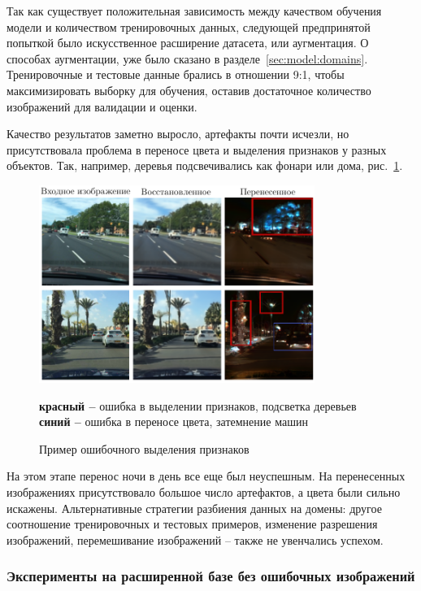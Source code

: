 \documentclass[11pt,a4paper]{extarticle}
\begin{document}
{			Так как существует положительная зависимость между качеством обучения модели и количеством тренировочных данных, следующей предпринятой попыткой было искусственное расширение датасета, или аугментация.
			О способах аугментации, уже было сказано в разделе~\ref{sec:model:domains}.
			Тренировочные и тестовые данные брались в отношении 9:1, чтобы максимизировать выборку для обучения, оставив достаточное количество изображений для валидации и оценки.
			
			Качество результатов заметно выросло, артефакты почти исчезли, но присутствовала проблема в переносе цвета и выделения признаков у разных объектов.
			Так, например, деревья подсвечивались как фонари или дома, рис.~\ref{pic:nexet_ext}.

			\begin{figure}[ht]
				\centering
				\includegraphics[width=0.8\textwidth]{img/nexet_ext}
				\caption{Пример ошибочного выделения признаков}{
					\small{
						{\color[HTML]{CB0000} \textbf{красный --}} ошибка в выделении признаков, подсветка деревьев \\
						{\color[HTML]{3b4daf} \textbf{синий --}} ошибка в переносе цвета, затемнение машин
					}
				}
				\label{pic:nexet_ext}
			\end{figure}
			
			\noindent
			На этом этапе перенос ночи в день все еще был неуспешным. На перенесенных изображениях присутствовало большое число артефактов, а цвета были сильно искажены.
			Альтернативные стратегии разбиения данных на домены: другое соотношение тренировочных и тестовых примеров, изменение разрешения изображений, перемешивание изображений -- также не увенчались успехом.
			
		\subsubsection{Эксперименты на расширенной базе без ошибочных изображений}\label{sec:tests:nexet_no_err}
			
}
\end{document}
